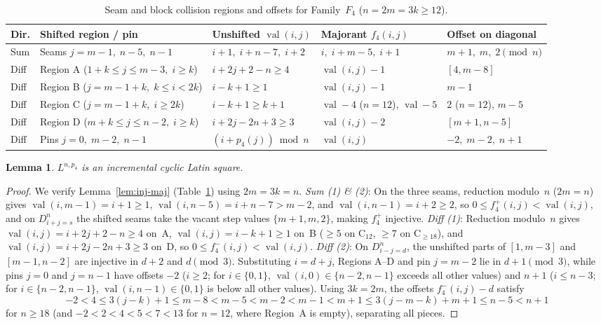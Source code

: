 \documentclass[10pt,a4paper]{article}
\newtheorem{lemma}[theorem]{Lemma}
\theoremstyle{remark}
\newcommand{\val}{\operatorname{val}}
\begin{document}
\begin{table}[htbp]
\centering
\footnotesize
\begin{tabular}{@{}lllll@{}}
\toprule
Dir. & Shifted region / pin & Unshifted $\val(i,j)$ & Majorant $f_4(i,j)$ & Offset on diagonal \\
\midrule
Sum & Seams $j = m - 1, \; n - 5, \; n - 1$ & $i+1, \; i+n-7, \; i+2$ & $i, \; i+m-5, \; i+1$ & $m+1, \; m, \; 2 \pmod n$ \\
Diff & Region A ($1+k \le j \le m-3, \; i \ge k$) & $i + 2j + 2 - n \ge 4$ & $\val(i,j) - 1$ & $[4, m-8]$ \\
Diff & Region B ($j = m-1+k, \; k \le i < 2k$) & $i - k + 1 \ge 1$ & $\val(i,j) - 1$ & $m - 1$ \\
Diff & Region C ($j = m-1+k, \; i \ge 2k$) & $i - k + 1 \ge k + 1$ & $\val - 4$ ($n=12$), $\val - 5$ & $2$ ($n=12$), $m - 5$ \\
Diff & Region D ($m+k \le j \le n-2, \; i \ge k$) & $i + 2j - 2n + 3 \ge 3$ & $\val(i,j) - 2$ & $[m+1, n-5]$ \\
Diff & Pins $j = 0, \; m - 2, \; n - 1$ & $(i + p_4(j)) \bmod n$ & $\val(i,j)$ & $-2, \; m - 2, \; n + 1$ \\
\bottomrule
\end{tabular}
\caption{Seam and block collision regions and offsets for Family~$F_4$ ($n = 2m = 3k \ge 12$).}
\label{tab:fam4}
\end{table}

\begin{lemma}\label{lem:fam4}
$L^{n,p_4}$ is an incremental cyclic Latin square.
\end{lemma}

\begin{proof}
We verify Lemma~\ref{lem:inj-maj} (Table~\ref{tab:fam4}) using $2m = 3k = n$.
\emph{Sum (1) \& (2)}: On the three seams, reduction modulo~$n$ ($2m = n$) gives $\val(i,m-1) = i + 1 \ge 1$,
$\val(i,n-5) = i + n - 7 > m - 2$, and $\val(i,n-1) = i + 2 \ge 2$, so $0 \le f^+_4(i,j) < \val(i,j)$,
and on $D^n_{i+j=s}$ the shifted seams take the vacant step values $\{m+1, m, 2\}$, making $f^+_4$
injective.
\emph{Diff (1)}: Reduction modulo~$n$ gives $\val(i,j) = i + 2j + 2 - n \ge 4$ on~A,
$\val(i,j) = i - k + 1 \ge 1$ on~B ($\ge 5$ on C$_{12}$, $\ge 7$ on C$_{\ge 18}$), and
$\val(i,j) = i + 2j - 2n + 3 \ge 3$ on~D, so $0 \le f^-_4(i,j) < \val(i,j)$.
\emph{Diff (2)}: On $D^n_{i-j=d}$, the unshifted parts of $[1,m-3]$ and $[m-1,n-2]$ are injective in
$d + 2$ and $d \pmod 3$. Substituting $i = d + j$, Regions A--D and pin $j = m - 2$ lie in
$d + 1 \pmod 3$, while pins $j = 0$ and $j = n - 1$ have offsets $-2$ ($i \ge 2$; for $i \in \{0,1\}$,
$\val(i,0) \in \{n-2,n-1\}$ exceeds all other values) and $n + 1$ ($i \le n - 3$; for
$i \in \{n-2,n-1\}$, $\val(i,n-1) \in \{0,1\}$ is below all other values). Using $3k = 2m$, the
offsets $f^-_4(i,j) - d$ satisfy
\[
    -2 < 4 \le 3(j - k) + 1 \le m - 8 < m - 5 < m - 2 < m - 1 < m + 1 \le 3(j - m - k) + m + 1 \le n - 5 < n + 1
\]
for $n \ge 18$ (and $-2 < 2 < 4 < 5 < 7 < 13$ for $n = 12$, where Region~A is empty), separating all
pieces.
\end{proof}
\end{document}
